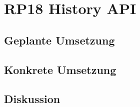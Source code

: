 \section{RP18 History API}
\label{sec:principle-rp18-history-api}

\subsection*{Geplante Umsetzung}


\subsection*{Konkrete Umsetzung}


\subsection*{Diskussion}

